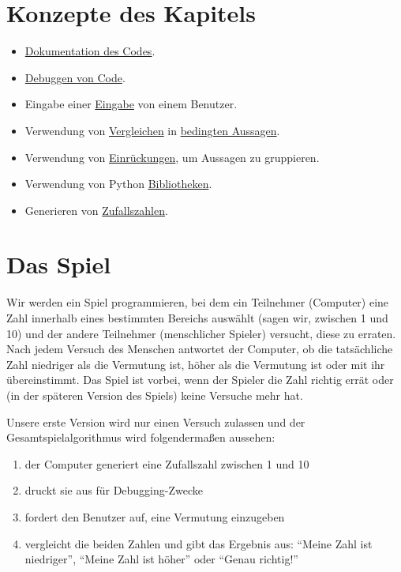 \documentclass[
]{book}
\providecommand{\tightlist}{%
  \setlength{\itemsep}{0pt}\setlength{\parskip}{0pt}}
\begin{document}
\hypertarget{konzepte-des-kapitels-1}{%
\section{Konzepte des Kapitels}\label{konzepte-des-kapitels-1}}

\begin{itemize}
\tightlist
\item
  \protect\hyperlink{documenting-your-code}{Dokumentation des Codes}.
\item
  \protect\hyperlink{debugging}{Debuggen von Code}.
\item
  Eingabe einer \protect\hyperlink{input-function}{Eingabe} von einem Benutzer.
\item
  Verwendung von \protect\hyperlink{comparisons}{Vergleichen} in \protect\hyperlink{if-statement}{bedingten Aussagen}.
\item
  Verwendung von \protect\hyperlink{indentation}{Einrückungen}, um Aussagen zu gruppieren.
\item
  Verwendung von Python \protect\hyperlink{using-libraries}{Bibliotheken}.
\item
  Generieren von \protect\hyperlink{picking-a-number-randomly}{Zufallszahlen}.
\end{itemize}

\hypertarget{das-spiel}{%
\section{Das Spiel}\label{das-spiel}}

Wir werden ein Spiel programmieren, bei dem ein Teilnehmer (Computer) eine Zahl innerhalb eines bestimmten Bereichs auswählt (sagen wir, zwischen 1 und 10) und der andere Teilnehmer (menschlicher Spieler) versucht, diese zu erraten. Nach jedem Versuch des Menschen antwortet der Computer, ob die tatsächliche Zahl niedriger als die Vermutung ist, höher als die Vermutung ist oder mit ihr übereinstimmt. Das Spiel ist vorbei, wenn der Spieler die Zahl richtig errät oder (in der späteren Version des Spiels) keine Versuche mehr hat.

Unsere erste Version wird nur einen Versuch zulassen und der Gesamtspielalgorithmus wird folgendermaßen aussehen:

\begin{enumerate}
\def\labelenumi{\arabic{enumi}.}
\tightlist
\item
  der Computer generiert eine Zufallszahl zwischen 1 und 10
\item
  druckt sie aus für Debugging-Zwecke
\item
  fordert den Benutzer auf, eine Vermutung einzugeben
\item
  vergleicht die beiden Zahlen und gibt das Ergebnis aus: ``Meine Zahl ist niedriger'', ``Meine Zahl ist höher'' oder ``Genau richtig!''
\end{enumerate}
\end{document}
